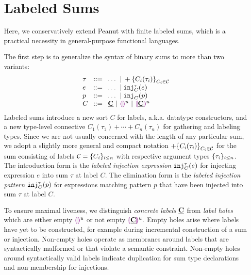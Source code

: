 \section{Labeled Sums}\label{sec:labeledsums}

Here, we conservatively extend Peanut with finite labeled sums, which is a practical necessity in general-purpose functional languages.

The first step is to generalize the syntax of binary sums to more than two variants:
\[
  \arraycolsep=4pt\begin{array}{lll}
    \tau & ::= & \ldots ~\vert~ \tlabeledsum{C_i(\tau_i)}_{C_i \in \tagset} \\
    e    & ::= & \ldots ~\vert~ \hinj{C}{\tau}{e}                           \\
    p    & ::= & \ldots ~\vert~ \hinjp{C}{p}                                \\
    C    & ::= & \tagC ~\vert~ \tagehole{u} ~\vert~ \taghole{\tagC}{u}
  \end{array}
\]
Labeled sums introduce a new sort $C$ for labels, a.k.a. datatype constructors, and a new type-level connective $C_1(\tau_1) + \cdots + C_n(\tau_n)$ for gathering and labeling types.
Since we are not usually concerned with the length of any particular sum,
we adopt a slightly more general and compact notation $+\mathopen{}\left\{C_i(\tau_i)\right\}_{C_i \in \mathcal{C}}$
for the sum consisting of labels $\mathcal{C} = \{C_i\}_{i \leq n}$ with respective argument types $\{\tau_i\}_{i \leq n}$.
The introduction form is the \emph{labeled injection expression} $\mathtt{inj}_{C}^{\tau}({e})$ for injecting expression $e$ into sum $\tau$ at label $C$.
The elimination form is the \emph{labeled injection pattern} $\mathtt{inj}_{C}^{\tau}({p})$ 
for expressions matching pattern $p$ that have been injected into sum $\tau$ at label $C$.

To ensure maximal liveness, we distinguish \emph{concrete labels} $\underline{\mathbf{C}}$
from \emph{label holes} which are either empty $\textcolor{violet}{\llparenthesis}\textcolor{violet}{\rrparenthesis}^{u}$ or not empty $\textcolor{violet}{\llparenthesis}\underline{\mathbf{C}}\textcolor{violet}{\rrparenthesis}^{u}$.
Empty holes arise where labels have yet to be constructed, for example during incremental construction of a sum or injection.
Non-empty holes operate as membranes around labels that are syntactically malformed or that violate a semantic constraint.
Non-empty holes around syntactically valid labels indicate duplication for sum type declarations and non-membership for injections.


